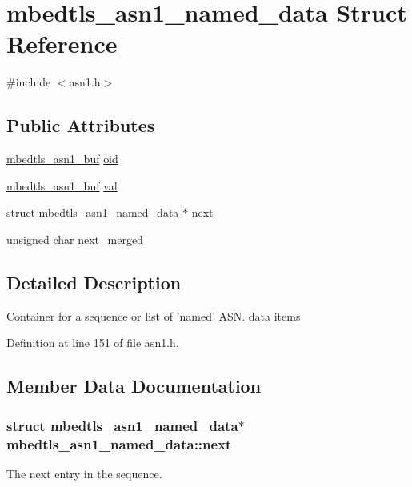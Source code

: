 \hypertarget{structmbedtls__asn1__named__data}{\section{mbedtls\-\_\-asn1\-\_\-named\-\_\-data Struct Reference}
\label{structmbedtls__asn1__named__data}
}


{\ttfamily \#include $<$asn1.\-h$>$}

\subsection*{Public Attributes}
\begin{DoxyCompactItemize}
\item 
\hyperlink{structmbedtls__asn1__buf}{mbedtls\-\_\-asn1\-\_\-buf} \hyperlink{structmbedtls__asn1__named__data_a0981fcdac0ce14b6922a953adf0624d9}{oid}
\item 
\hyperlink{structmbedtls__asn1__buf}{mbedtls\-\_\-asn1\-\_\-buf} \hyperlink{structmbedtls__asn1__named__data_ad99636f90fae31a96c26df85a7896b07}{val}
\item 
struct \hyperlink{structmbedtls__asn1__named__data}{mbedtls\-\_\-asn1\-\_\-named\-\_\-data} $\ast$ \hyperlink{structmbedtls__asn1__named__data_a38f29c37c55319b3c0a9c998c3e5bd0d}{next}
\item 
unsigned char \hyperlink{structmbedtls__asn1__named__data_aee15b65458fa2c10596ff7c210ba4ee1}{next\-\_\-merged}
\end{DoxyCompactItemize}


\subsection{Detailed Description}
Container for a sequence or list of 'named' A\-S\-N. data items 

Definition at line 151 of file asn1.\-h.



\subsection{Member Data Documentation}
\hypertarget{structmbedtls__asn1__named__data_a38f29c37c55319b3c0a9c998c3e5bd0d}{
\subsubsection[{next}]{\setlength{\rightskip}{0pt plus 5cm}struct {\bf mbedtls\-\_\-asn1\-\_\-named\-\_\-data}$\ast$ mbedtls\-\_\-asn1\-\_\-named\-\_\-data\-::next}}\label{structmbedtls__asn1__named__data_a38f29c37c55319b3c0a9c998c3e5bd0d}
The next entry in the sequence. 

